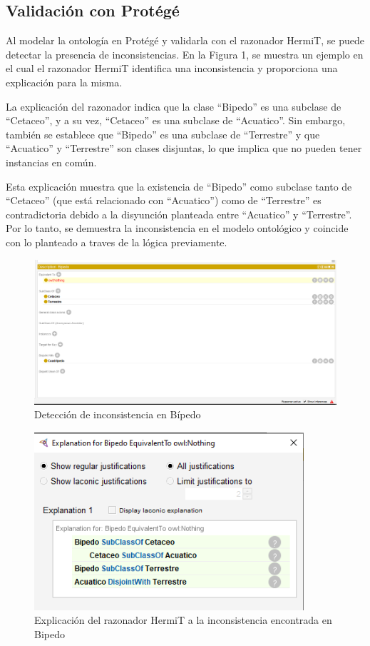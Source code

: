 \subsection{Validación con Protégé}
Al modelar la ontología en Protégé y validarla con el razonador HermiT, se puede detectar la presencia de inconsistencias. En la Figura 1, se muestra un ejemplo en el cual el razonador HermiT identifica una inconsistencia y proporciona una explicación para la misma.

La explicación del razonador indica que la clase ``Bipedo'' es una subclase de ``Cetaceo'', y a su vez, ``Cetaceo'' es una subclase de ``Acuatico''. Sin embargo, también se establece que ``Bipedo'' es una subclase de ``Terrestre'' y que ``Acuatico'' y ``Terrestre'' son clases disjuntas, lo que implica que no pueden tener instancias en común.

Esta explicación muestra que la existencia de ``Bipedo'' como subclase tanto de ``Cetaceo'' (que está relacionado con ``Acuatico'') como de ``Terrestre'' es contradictoria debido a la disyunción planteada entre ``Acuatico'' y ``Terrestre''. Por lo tanto, se demuestra la inconsistencia en el modelo ontológico y coincide con lo planteado a traves de la lógica previamente.

\begin{figure}[!h]
  \centering
  \includegraphics[width=16cm, scale=1]{Images/Imagenes/Protege1.png}
  \caption{Detección de inconsistencia en Bípedo}
  \label{fig:prot1}
\end{figure}

\begin{figure}[!h]
  \centering
  \includegraphics[width=10cm, scale=1]{Images/Imagenes/Protege2.png}
  \caption{Explicación del razonador HermiT a la inconsistencia encontrada en Bipedo}
  \label{fig:prot2}
\end{figure}

